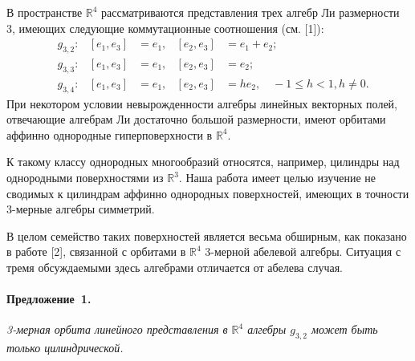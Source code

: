 
\vzmscaption


В пространстве $\mathbb{R}^4 $ рассматриваются представления трех алгебр Ли размерности 3, имеющих следующие
коммутационные соотношения (см. [1]):
\begin{align*}
	&g_{3,2} : & [e_1,e_3] &= e_1, & [e_2,e_3] &= e_1 + e_2;\\
	&g_{3,3} : & [e_1,e_3] &= e_1, & [e_2,e_3] &= e_2;\\
    &g_{3,4} : & [e_1,e_3] &= e_1, & [e_2,e_3] &=  h e_2, \quad -1 \leqslant h < 1, h \neq 0.
\end{align*}
При некотором условии невырожденности алгебры линейных векторных полей, отвечающие алгебрам Ли достаточно большой размерности, имеют орбитами аффинно однородные гиперповерхности в $\mathbb{R}^4$.

К такому классу однородных многообразий относятся, например, цилиндры над однородными поверхностями из $\mathbb{R}^3$.
Наша работа имеет целью изучение не сводимых к цилиндрам аффинно однородных поверхностей, имеющих в точности 3-мерные алгебры симметрий.

В целом семейство таких поверхностей является весьма обширным, как показано в работе [2], связанной с орбитами в $\mathbb{R}^4$ 3-мерной абелевой алгебры. Ситуация с тремя обсуждаемыми здесь алгебрами отличается от абелева случая.

\paragraph{Предложение~1.}
{\it
3-мерная орбита линейного представления в $\mathbb{R}^4$ алгебры $g_{3,2}$ может быть только цилиндрической.
}

